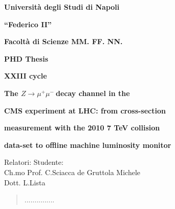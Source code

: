 \documentclass[a4paper,12pt]{book}
\newcommand{\Zmm}{$Z\rightarrow \mu^+ \mu^- \:$}
\begin{document}
\frontmatter
\begin{titlepage}



\begin{center} 

\begin{center}
\centerline{\Huge{\bf Universit\`{a} degli Studi di Napoli}} \centerline{\Huge {\bf
``Federico II''}} \vspace*{0.1 cm}


\begin{figure}[h]
%
\begin{center}
\end{center}
\end{figure}
\vspace*{.5 cm} \centerline{\LARGE \bf Facolt\`{a} di Scienze
  MM. FF. NN.} \vspace{0.4cm}
\Large{\bf PHD Thesis} \vspace{1.4 cm} \centerline{{\bf \Large{\bf XXIII cycle} }}
 \vspace{0.2cm} \centerline{\LARGE {\bf The \Zmm decay channel in the}}
 \vspace{0.2 cm} \centerline{\LARGE {\bf CMS experiment at
     LHC: from cross-section}}
 \vspace{0.2 cm} \centerline{\LARGE {\bf measurement with the 2010 7
     TeV collision}}
  \vspace{0.2 cm} \centerline{\LARGE {\bf data-set to offline machine luminosity monitor}}

  \vspace{4cm}
\begin{flushleft}
 { \large  Relatori:} \hfill {\large  Studente:}\\
\large Ch.mo Prof. C.Sciacca \hfill {\large  de Gruttola Michele}\\
\large{Dott. L.Lista} \\
\end{flushleft}
\end{center}
\end{center}
\end{titlepage}

\newpage

\clearpage{\pagestyle{empty}\cleardoublepage} \thispagestyle{empty}
 \vspace*{6cm} \hspace*{10cm}
\begin{quotation}
 {\footnotesize{\noindent 
...............
 }}
 \end{quotation}
\newpage
 \clearpage{\pagestyle{empty}\cleardoublepage}
 \tableofcontents
\clearpage{\pagestyle{empty}\cleardoublepage} \thispagestyle{empty}
 \listoffigures
\end{document}
